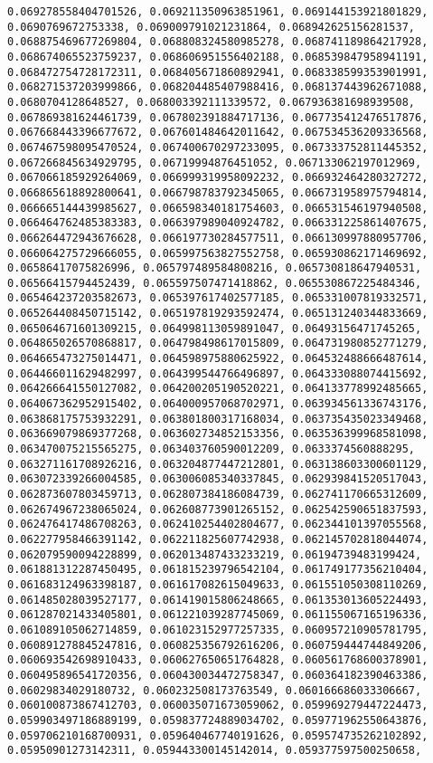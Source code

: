 \documentclass[11pt]{article}
\begin{document}
\begin{Verbatim}[commandchars=\\\{\}]
0.069278558404701526, 0.069211350963851961, 0.069144153921801829, 0.0690769672753338, 0.069009791021231864, 0.068942625156281537, 0.068875469677269804, 0.068808324580985278, 0.068741189864217928, 0.068674065523759237, 0.068606951556402188, 0.068539847958941191, 0.068472754728172311, 0.068405671860892941, 0.068338599353901991, 0.068271537203999866, 0.068204485407988416, 0.068137443962671088, 0.0680704128648527, 0.068003392111339572, 0.067936381698939508, 0.067869381624461739, 0.067802391884717136, 0.067735412476517876, 0.067668443396677672, 0.067601484642011642, 0.067534536209336568, 0.067467598095470524, 0.067400670297233095, 0.067333752811445352, 0.067266845634929795, 0.06719994876451052, 0.067133062197012969, 0.067066185929264069, 0.066999319958092232, 0.066932464280327272, 0.066865618892800641, 0.066798783792345065, 0.066731958975794814, 0.066665144439985627, 0.066598340181754603, 0.066531546197940508, 0.066464762485383383, 0.066397989040924782, 0.066331225861407675, 0.066264472943676628, 0.066197730284577511, 0.066130997880957706, 0.066064275729666055, 0.065997563827552758, 0.065930862171469692, 0.06586417075826996, 0.065797489584808216, 0.065730818647940531, 0.06566415794452439, 0.065597507471418862, 0.065530867225484346, 0.065464237203582673, 0.065397617402577185, 0.065331007819332571, 0.065264408450715142, 0.065197819293592474, 0.065131240344833669, 0.065064671601309215, 0.064998113059891047, 0.06493156471745265, 0.064865026570868817, 0.064798498617015809, 0.064731980852771279, 0.064665473275014471, 0.064598975880625922, 0.064532488666487614, 0.064466011629482997, 0.064399544766496897, 0.064333088074415692, 0.064266641550127082, 0.064200205190520221, 0.064133778992485665, 0.064067362952915402, 0.064000957068702971, 0.063934561336743176, 0.063868175753932291, 0.063801800317168034, 0.063735435023349468, 0.063669079869377268, 0.063602734852153356, 0.063536399968581098, 0.063470075215565275, 0.063403760590012209, 0.0633374560888295, 0.063271161708926216, 0.063204877447212801, 0.063138603300601129, 0.063072339266004585, 0.063006085340337845, 0.062939841520517043, 0.062873607803459713, 0.062807384186084739, 0.062741170665312609, 0.062674967238065024, 0.062608773901265152, 0.062542590651837593, 0.062476417486708263, 0.062410254402804677, 0.062344101397055568, 0.062277958466391142, 0.062211825607742938, 0.062145702818044074, 0.062079590094228899, 0.062013487433233219, 0.06194739483199424, 0.061881312287450495, 0.061815239796542104, 0.061749177356210404, 0.061683124963398187, 0.061617082615049633, 0.061551050308110269, 0.061485028039527177, 0.061419015806248665, 0.061353013605224493, 0.061287021433405801, 0.061221039287745069, 0.061155067165196336, 0.061089105062714859, 0.061023152977257335, 0.060957210905781795, 0.060891278845247816, 0.060825356792616206, 0.060759444744849206, 0.060693542698910433, 0.060627650651764828, 0.060561768600378901, 0.060495896541720356, 0.060430034472758347, 0.060364182390463386, 0.06029834029180732, 0.060232508173763549, 0.060166686033306667, 0.060100873867412703, 0.060035071673059062, 0.059969279447224473, 0.059903497186889199, 0.059837724889034702, 0.059771962550643876, 0.059706210168700931, 0.059640467740191626, 0.059574735262102892, 0.05950901273142311, 0.059443300145142014, 0.059377597500250658, 
\end{Verbatim}
\end{document}

